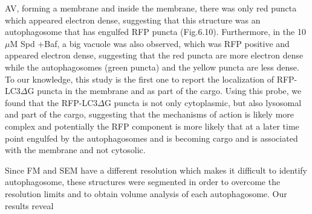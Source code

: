 AV, forming a membrane and inside the membrane, there was only red puncta which appeared electron dense, suggesting that this structure was an autophagosome that has engulfed RFP puncta (Fig.6.10). Furthermore, in the 10 $\mu$M Spd +Baf, a big vacuole was also observed, which was RFP positive and appeared electron dense, suggesting that the red puncta are more electron dense while the autophagosomes (green puncta) and the yellow puncta are less dense. To our knowledge, this study is the first one to report the localization of RFP-LC3$\Delta$G puncta in the membrane and as part of the cargo. Using this probe, we found that the RFP-LC3$\Delta$G puncta is not only cytoplasmic, but also lysosomal and part of the cargo, suggesting that the mechanisms of action is likely more complex and potentially the RFP component is more likely that at a later time point engulfed by the autophagosomes and is becoming cargo and is associated with the membrane and not cytosolic.

Since FM and SEM have a different resolution which makes it difficult to identify autophagosome, these structures were segmented in order to overcome the resolution limits and to obtain volume analysis of each autophagosome. Our results reveal
















